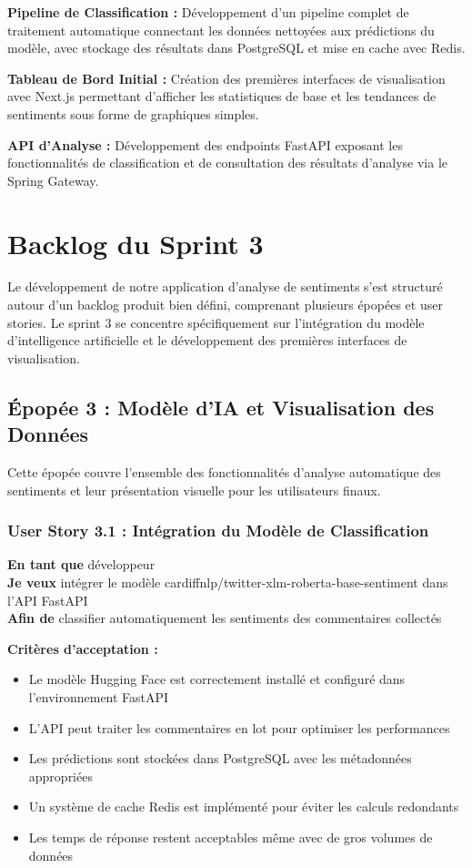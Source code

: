 \textbf{Pipeline de Classification :} Développement d'un pipeline complet de traitement automatique connectant les données nettoyées aux prédictions du modèle, avec stockage des résultats dans PostgreSQL et mise en cache avec Redis.

\textbf{Tableau de Bord Initial :} Création des premières interfaces de visualisation avec Next.js permettant d'afficher les statistiques de base et les tendances de sentiments sous forme de graphiques simples.

\textbf{API d'Analyse :} Développement des endpoints FastAPI exposant les fonctionnalités de classification et de consultation des résultats d'analyse via le Spring Gateway.

\section{Backlog du Sprint 3}

Le développement de notre application d'analyse de sentiments s'est structuré autour d'un backlog produit bien défini, comprenant plusieurs épopées et user stories. Le sprint 3 se concentre spécifiquement sur l'intégration du modèle d'intelligence artificielle et le développement des premières interfaces de visualisation.

\subsection{Épopée 3 : Modèle d'IA et Visualisation des Données}

Cette épopée couvre l'ensemble des fonctionnalités d'analyse automatique des sentiments et leur présentation visuelle pour les utilisateurs finaux.

\subsubsection{User Story 3.1 : Intégration du Modèle de Classification}

\textbf{En tant que} développeur \\
\textbf{Je veux} intégrer le modèle cardiffnlp/twitter-xlm-roberta-base-sentiment dans l'API FastAPI \\
\textbf{Afin de} classifier automatiquement les sentiments des commentaires collectés

\textbf{Critères d'acceptation :}
\begin{itemize}
    \item Le modèle Hugging Face est correctement installé et configuré dans l'environnement FastAPI
    \item L'API peut traiter les commentaires en lot pour optimiser les performances
    \item Les prédictions sont stockées dans PostgreSQL avec les métadonnées appropriées
    \item Un système de cache Redis est implémenté pour éviter les calculs redondants
    \item Les temps de réponse restent acceptables même avec de gros volumes de données
\end{itemize}

